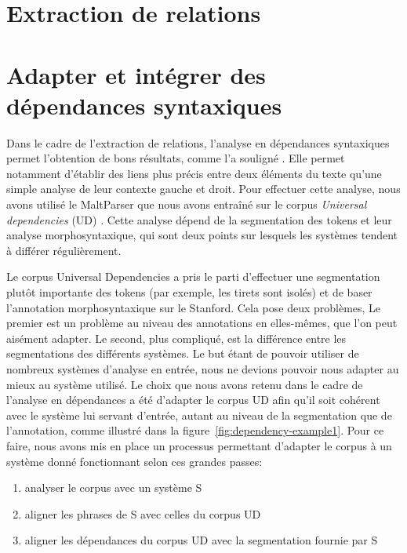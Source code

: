 \documentclass[12pt,a4paper,times,twoside,openright]{report}
\begin{document}
\section*{Extraction de relations}
%
        \section*{Adapter et intégrer des dépendances syntaxiques}
Dans le cadre de l'extraction de relations, l'analyse en dépendances syntaxiques permet l'obtention de bons résultats, comme l'a souligné \citet{bach2007review}. Elle permet notamment d'établir des liens plus précis entre deux éléments du texte qu'une simple analyse de leur contexte gauche et droit. Pour effectuer cette analyse, nous avons utilisé le MaltParser \citep{nivre2006maltparser} que nous avons entraîné sur le corpus \emph{Universal dependencies} (UD) \citep{nivre2016universal}. Cette analyse dépend de la segmentation des tokens et leur analyse morphosyntaxique, qui sont deux points sur lesquels les systèmes tendent à différer régulièrement.

Le corpus Universal Dependencies a pris le parti d'effectuer une segmentation plutôt importante des tokens (par exemple, les tirets sont isolés) et de baser l'annotation morphosyntaxique sur le Stanford. Cela pose deux problèmes, Le premier est un problème au niveau des annotations en elles-mêmes, que l'on peut aisément adapter. Le second, plus compliqué, est la différence entre les segmentations des différents systèmes. Le but étant de pouvoir utiliser de nombreux systèmes d'analyse en entrée, nous ne devions pouvoir nous adapter au mieux au système utilisé. Le choix que nous avons retenu dans le cadre de l'analyse en dépendances a été d'adapter le corpus UD afin qu'il soit cohérent avec le système lui servant d'entrée, autant au niveau de la segmentation que de l'annotation, comme illustré dans la figure\ \ref{fig:dependency-example1}. Pour ce faire, nous avons mis en place un processus permettant d'adapter le corpus à un système donné fonctionnant selon ces grandes passes:

\begin{enumerate}
    \item analyser le corpus avec un système S
    \item aligner les phrases de S avec celles du corpus UD
    \item aligner les dépendances du corpus UD avec la segmentation fournie par S
\end{enumerate}
\end{document}
